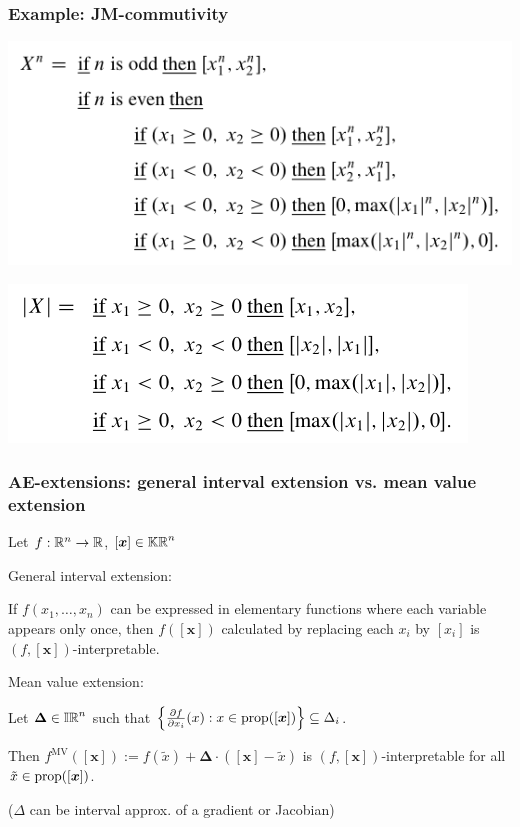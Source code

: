 \documentclass{beamer}
\newcommand{\fMV}{f^{\text{MV}}}
\begin{document}
\begin{frame}
    \frametitle{Example: JM-commutivity}

    \includegraphics[scale=0.4]{kaucher-pow.png}

    \vspace{7mm}
    \includegraphics[scale=0.4]{kaucher-abs.png}

\end{frame}

\begin{frame}
    \frametitle{AE-extensions: general interval extension vs. mean value extension}

    Let $f: \mathbb R^n \rightarrow \mathbb R$, $[\bm{x}] \in \mathbb{KR}^n$

    \vspace{7mm}
    General interval extension: \par
    If $f(x_1, \ldots, x_n)$ can be expressed in elementary functions where each variable appears only once, then $f([\bm{x}])$ calculated by replacing each $x_i$ by $[x_i]$ is $(f,[\bm{x}])$-interpretable.

    \vspace{7mm}
    Mean value extension: \par
    Let $\bm{\Delta} \in \mathbb{IR}^n$ such that $\left\{\frac{\partial f}{\partial x_i}(x) : x \in \text{prop}([\bm{x}])\right\} \subseteq \Delta_i$. \par
    Then $\fMV([\bm{x}]) := f(\tilde{x}) + \bm{\Delta} \cdot ([\bm{x}] - \tilde{x})$ is $(f, [\bm{x}])$-interpretable for all $\tilde{x} \in \text{prop}([\bm{x}])$.

    \vspace{7mm}
    ($\Delta$ can be interval approx. of a gradient or Jacobian)
\end{frame}
\end{document}
